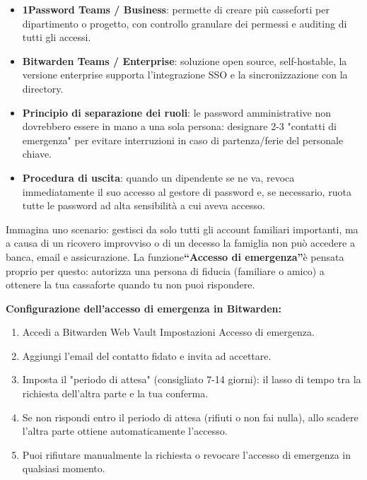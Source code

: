 
\begin{itemize}
  \item \textbf{1Password Teams / Business}: permette di creare più casseforti per dipartimento o progetto, con controllo granulare dei permessi e auditing di tutti gli accessi.
  \item \textbf{Bitwarden Teams / Enterprise}: soluzione open source, self-hostable, la versione enterprise supporta l'integrazione SSO e la sincronizzazione con la directory.
  \item \textbf{Principio di separazione dei ruoli}: le password amministrative non dovrebbero essere in mano a una sola persona: designare 2-3 "contatti di emergenza" per evitare interruzioni in caso di partenza/ferie del personale chiave.
  \item \textbf{Procedura di uscita}: quando un dipendente se ne va, revoca immediatamente il suo accesso al gestore di password e, se necessario, ruota tutte le password ad alta sensibilità a cui aveva accesso.
\end{itemize}


Immagina uno scenario: gestisci da solo tutti gli account familiari importanti, ma a causa di un ricovero improvviso o di un decesso la famiglia non può accedere a banca, email e assicurazione. La funzione\textbf{“Accesso di emergenza”}è pensata proprio per questo: autorizza una persona di fiducia (familiare o amico) a ottenere la tua cassaforte quando tu non puoi rispondere.

\textbf{Configurazione dell'accesso di emergenza in Bitwarden:}

\begin{enumerate}
  \item Accedi a Bitwarden Web Vault Impostazioni Accesso di emergenza.
  \item Aggiungi l'email del contatto fidato e invita ad accettare.
  \item Imposta il "periodo di attesa" (consigliato 7-14 giorni): il lasso di tempo tra la richiesta dell'altra parte e la tua conferma.
  \item Se non rispondi entro il periodo di attesa (rifiuti o non fai nulla), allo scadere l'altra parte ottiene automaticamente l'accesso.
  \item Puoi rifiutare manualmente la richiesta o revocare l'accesso di emergenza in qualsiasi momento.
\end{enumerate}

